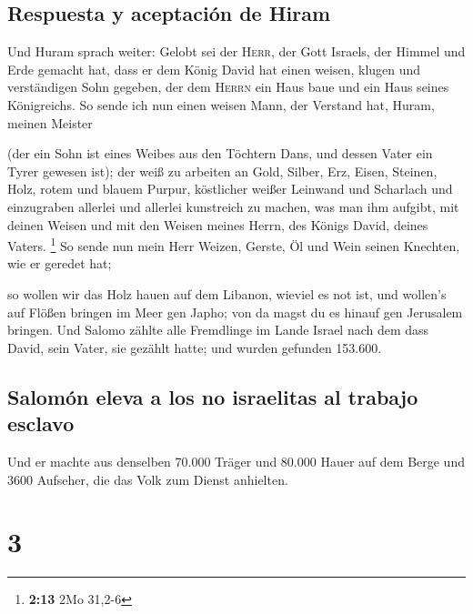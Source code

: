 \hypertarget{respuesta-y-aceptaciuxf3n-de-hiram}{%
\subsection{Respuesta y aceptación de
Hiram}\label{respuesta-y-aceptaciuxf3n-de-hiram}}

 Und Huram sprach weiter: Gelobt sei der \textsc{Herr},
der Gott Israels, der Himmel und Erde gemacht hat, dass er dem König
David hat einen weisen, klugen und verständigen Sohn gegeben, der dem
\textsc{Herrn} ein Haus baue und ein Haus seines Königreichs.
 So sende ich nun einen weisen Mann, der Verstand hat,
Huram, meinen Meister

 (der ein Sohn ist eines Weibes aus den Töchtern Dans,
und dessen Vater ein Tyrer gewesen ist); der weiß zu arbeiten an Gold,
Silber, Erz, Eisen, Steinen, Holz, rotem und blauem Purpur, köstlicher
weißer Leinwand und Scharlach und einzugraben allerlei und allerlei
kunstreich zu machen, was man ihm aufgibt, mit deinen Weisen und mit den
Weisen meines Herrn, des Königs David, deines Vaters. \footnote{\textbf{2:13}
  2Mo 31,2-6}  So sende nun mein Herr Weizen, Gerste, Öl
und Wein seinen Knechten, wie er geredet hat;

 so wollen wir das Holz hauen auf dem Libanon, wieviel es
not ist, und wollen's auf Flößen bringen im Meer gen Japho; von da magst
du es hinauf gen Jerusalem bringen.  Und Salomo zählte
alle Fremdlinge im Lande Israel nach dem dass David, sein Vater, sie
gezählt hatte; und wurden gefunden 153.600.

\hypertarget{salomuxf3n-eleva-a-los-no-israelitas-al-trabajo-esclavo}{%
\subsection{Salomón eleva a los no israelitas al trabajo
esclavo}\label{salomuxf3n-eleva-a-los-no-israelitas-al-trabajo-esclavo}}

 Und er machte aus denselben 70.000 Träger und 80.000
Hauer auf dem Berge und 3600 Aufseher, die das Volk zum Dienst
anhielten.

\hypertarget{section-2}{%
\section{3}\label{section-2}}

